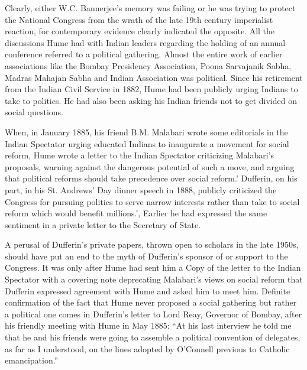 \begin{multicols}{2}
Clearly, either W.C. Bannerjee's memory was failing or he was trying to protect the National Congress from the wrath of the late 19th century imperialist reaction, for contemporary evidence clearly indicated the opposite. All the discussions Hume had with Indian leaders regarding the holding of an annual conference referred to a political gathering. Almost the entire work of earlier associations like the Bombay Presidency Association, Poona Sarvajanik Sabha, Madras Mahajan Sabha and Indian Association was political. Since his retirement from the Indian Civil Service in 1882, Hume had been publicly urging Indians to take to politics. He had also been asking his Indian friends not to get divided on social questions.

When, in January 1885, his friend B.M. Malabari wrote some editorials in the Indian Spectator urging educated Indians to inaugurate a movement for social reform, Hume wrote a letter to the Indian Spectator criticizing Malabari's proposals, warning against the dangerous potential of such a move, and arguing that political reforms should take precedence over social reform.' Dufferin, on his part, in his St. Andrews' Day dinner speech in 1888, publicly criticized the Congress for pursuing politics to serve narrow interests rather than take to social reform which would benefit millions.', Earlier he had expressed the same sentiment in a private letter to the Secretary of State.

A perusal of Dufferin's private papers, thrown open to scholars in the late 1950s, should have put an end to the myth of Dufferin's sponsor of or support to the Congress. It was only after Hume had sent him a Copy of the letter to the Indian Spectator with a covering note deprecating Malabari's views on social reform that Dufferin expressed agreement with Hume and asked him to meet him. Definite confirmation of the fact that Hume never proposed a social gathering but rather a political one comes in Dufferin's letter to Lord Reay, Governor of Bombay, after his friendly meeting with Hume in May 1885: ``At his last interview he told me that he and his friends were going to assemble a political convention of delegates, as far as I understood, on the lines adopted by O'Connell previous to Catholic emancipation.''


\end{multicols}
